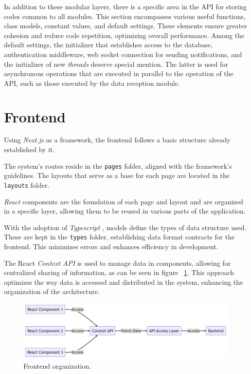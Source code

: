 In addition to these modular layers, there is a specific area in the \gls{API} for storing codes common to all modules. This section encompasses various useful functions, class models, constant values, and default settings. These elements ensure greater cohesion and reduce code repetition, optimizing overall performance. Among the default settings, the initializer that establishes access to the database, authentication middleware, web socket connection for sending notifications, and the initializer of new \textit{threads} deserve special mention. The latter is used for asynchronous operations that are executed in parallel to the operation of the \gls{API}, such as those executed by the data reception module.

\section[Frontend]{Frontend}\label{sec:archFront}
Using \textit{Next.js} \cite{nextjsDocs} as a framework, the frontend follows a basic structure already established by it.

The system's routes reside in the \texttt{pages} folder, aligned with the framework's guidelines. The layouts that serve as a base for each page are located in the \texttt{layouts} folder.

\textit{React} components \cite{reactDocs} are the foundation of each page and layout and are organized in a specific layer, allowing them to be reused in various parts of the application.

With the adoption of \textit{Typescript} \cite{typescriptLang}, models define the types of data structure used. These are kept in the \texttt{types} folder, establishing data format contracts for the frontend. This minimizes errors and enhances efficiency in development.

The React \textit{Context API} is used to manage data in components, allowing for centralized sharing of information, as can be seen in figure ~\ref{fig:FrontendOrganization}. This approach optimizes the way data is accessed and distributed in the system, enhancing the organization of the architecture.

\begin{figure}[htbp]
	\centering
	\includegraphics[scale=0.4]{images/components_frontend.png}
	\caption{Frontend organization.}
	\label{fig:FrontendOrganization}
\end{figure}

